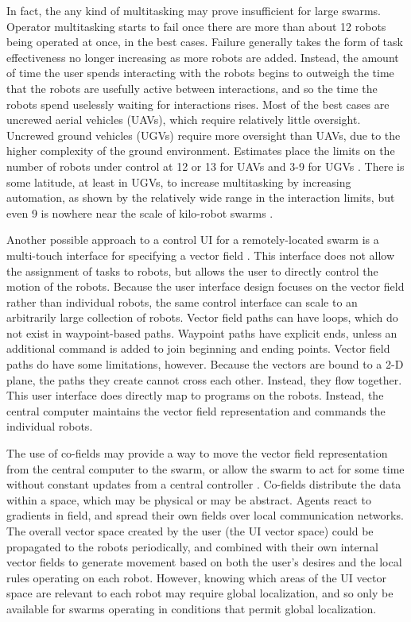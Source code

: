 \documentclass[]{article}
\begin{document}
In fact, the any kind of multitasking may prove insufficient for large swarms. 
Operator multitasking starts to fail once there are more than about 12 robots being operated at once, in the best cases.
Failure generally takes the form of task effectiveness no longer increasing as more robots are added.
Instead, the amount of time the user spends interacting with the robots begins to outweigh the time that the robots are usefully active between interactions, and so the time the robots spend uselessly waiting for interactions rises. 
Most of the best cases are uncrewed aerial vehicles (UAVs), which require relatively little oversight. 
Uncrewed ground vehicles (UGVs) require more oversight than UAVs, due to the higher complexity of the ground environment. 
Estimates place the limits on the number of robots under control at 12 or 13 for UAVs and 3-9 for UGVs \cite{WangSearchScale}.  
There is some latitude, at least in UGVs, to increase multitasking by increasing automation, as shown by the relatively wide range in the interaction limits, but even 9 is nowhere near the scale of kilo-robot swarms \cite{Olsen:2004:FMH:985692.985722}.

Another possible approach to a control UI for a remotely-located swarm is a multi-touch interface for specifying a vector field \cite{Kato:2009:MIC:1520340.1520500}.
This interface does not allow the assignment of tasks to robots, but allows the user to directly control the motion of the robots. 
Because the user interface design focuses on the vector field rather than individual robots, the same control interface can scale to an arbitrarily large collection of robots. Vector field paths can have loops, which do not exist in waypoint-based paths. 
Waypoint paths have explicit ends, unless an additional command is added to join beginning and ending points. 
Vector field paths do have some limitations, however. 
Because the vectors are bound to a 2-D plane, the paths they create cannot cross each other. 
Instead, they flow together. 
This user interface does directly map to programs on the robots. 
Instead, the central computer maintains the vector field representation and commands the individual robots.

The use of co-fields may provide a way to move the vector field representation from the central computer to the swarm, or allow the swarm to act for some time without constant updates from a central controller \cite{mamei2003co}.
Co-fields distribute the data within a space, which may be physical or may be abstract. 
Agents react to gradients in field, and spread their own fields over local communication networks. 
The overall vector space created by the user (the UI vector space) could be propagated to the robots periodically, and combined with their own internal vector fields to generate movement based on both the user's desires and the local rules operating on each robot. 
However, knowing which areas of the UI vector space are relevant to each robot may require  global localization, and so only be available for swarms operating in conditions that permit global localization. 
\end{document}
